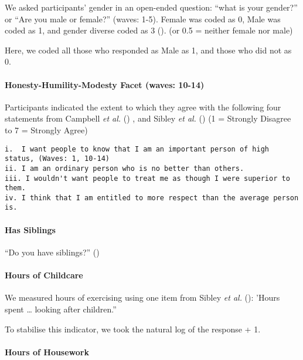 \documentclass[
  singlecolumn]{article}
\let\oldparagraph\paragraph
\renewcommand{\paragraph}[1]{\oldparagraph{#1}\mbox{}}
\begin{document}
We asked participants' gender in an open-ended question: ``what is your
gender?'' or ``Are you male or female?'' (waves: 1-5). Female was coded
as 0, Male was coded as 1, and gender diverse coded as 3
(). (or 0.5
= neither female nor male)

Here, we coded all those who responded as Male as 1, and those who did
not as 0.

\paragraph{Honesty-Humility-Modesty Facet (waves:
10-14)}\label{honesty-humility-modesty-facet-waves-10-14}

Participants indicated the extent to which they agree with the following
four statements from Campbell \emph{et al.}
() , and Sibley \emph{et al.}
() (1 = Strongly Disagree to 7 = Strongly
Agree)

\begin{verbatim}
i.  I want people to know that I am an important person of high status, (Waves: 1, 10-14)
ii. I am an ordinary person who is no better than others.
iii. I wouldn't want people to treat me as though I were superior to them.
iv. I think that I am entitled to more respect than the average person is.
\end{verbatim}

\paragraph{Has Siblings}\label{has-siblings}

``Do you have siblings?'' ()

\paragraph{Hours of Childcare}\label{hours-of-childcare}

We measured hours of exercising using one item from Sibley \emph{et al.}
(): 'Hours spent \ldots{} looking after
children.''

To stabilise this indicator, we took the natural log of the response +
1.

\paragraph{Hours of Housework}\label{hours-of-housework}
\end{document}
